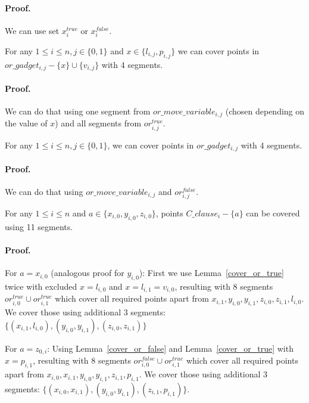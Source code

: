 \paragraph{Proof.}
We can use set $x^{true}_i$ or $x^{false}_i$.

\begin{lemma}
\label{cover_or_true}
For any $1 \le i \le n, j \in \{0, 1\}$ and 
 $x \in \{l_{i, j}, p_{i, j}\}$ we can cover points in
$or\_gadget_{i, j} - \{ x\} \cup \{v_{i, j}\}$
with 4 segments.
\end{lemma}

\paragraph{Proof.}
We can do that using one segment from
$or\_move\_variable_{i, j}$
(chosen depending on the value of $x$)
and all segments from $or^{true}_{i, j}$.

\begin{lemma}
\label{cover_or_false}
For any $1 \le i \le n, j \in \{0, 1\}$, we can cover points in $or\_gadget_{i, j}$
with 4 segments.
\end{lemma}
\paragraph{Proof.}
We can do that using  $or\_move\_variable_{i, j}$
and $or^{false}_{i, j}$.


\begin{lemma}
\label{cover_clauses_solution_true}
For any $1 \le i \le n$ and $a \in \{ x_{i, 0}, y_{i, 0}, z_{i, 0}\}$,
points $C\_clause_i - \{a\}$ can be covered using 11 segments.
\end{lemma}

\paragraph{Proof.}
For $a = x_{i, 0}$ (analogous proof for $y_{i, 0}$):
First we use Lemma~\ref{cover_or_true} twice with excluded $x = l_{i, 0}$ and
$x = l_{i, 1} = v_{i, 0}$,
resulting with 8 segments $or^{true}_{i, 0} \cup or^{true}_{i, 1}$
which cover all required points apart from
$x_{i, 1}, y_{i, 0}, y_{i, 1}, z_{i, 0}, z_{i, 1}, l_{i, 0}$.
We cover those using additional 3 segments:
$\{ (x_{i, 1}, l_{i, 0}), (y_{i, 0}, y_{i, 1}),
(z_{i, 0}, z_{i, 1}) \}$

For $a = z_{0, i}$:
Using Lemma~\ref{cover_or_false} and Lemma~\ref{cover_or_true} with
$x = p_{i, 1}$,
resulting with 8 segments $or^{false}_{i, 0} \cup or^{true}_{i, 1}$
which cover all required points apart from
$x_{i, 0}, x_{i, 1}, y_{i, 0}, y_{i, 1}, z_{i, 1}, p_{i, 1}$.
We cover those using additional 3 segments:
$\{ (x_{i, 0}, x_{i, 1}), (y_{i, 0}, y_{i, 1}),
(z_{i, 1}, p_{i, 1}) \}$.

